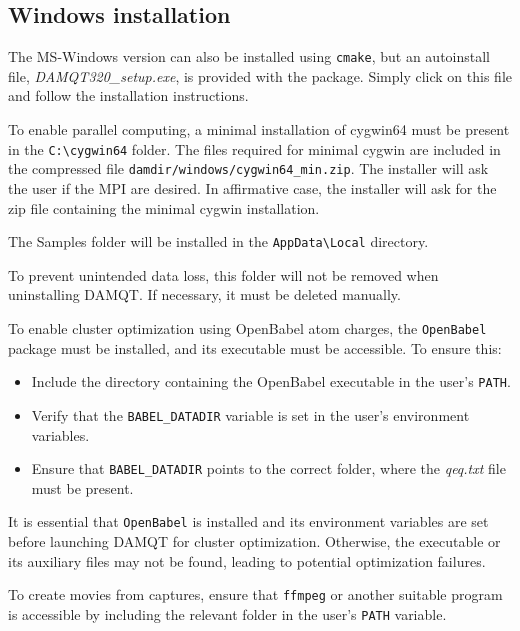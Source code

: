\documentclass[10pt]{article}
\begin{document}
\subsection{Windows installation \label{sec:1.2}}

The MS-Windows version can also be installed using \texttt{cmake}, but an autoinstall file,
{\it DAMQT320\_setup.exe}, is provided with the package. Simply click on this file and follow the installation instructions.

To enable parallel computing, a minimal installation of cygwin64 must be present
in the \texttt{C:\textbackslash{}cygwin64} folder. The files required for minimal cygwin are included
in the compressed file \texttt{damdir/windows/cygwin64\_min.zip}. The installer
will ask the user if the MPI are desired. In affirmative case, the installer will 
ask for the zip file containing the minimal cygwin installation.

The Samples folder will be installed in the \texttt{AppData\textbackslash{}Local} directory.

To prevent unintended data loss, this folder will not be removed when uninstalling DAMQT.
If necessary, it must be deleted manually.

To enable cluster optimization using OpenBabel atom charges, the \texttt{OpenBabel} package must be installed,
and its executable must be accessible. To ensure this:

\begin{itemize}
\item Include the directory containing the OpenBabel executable in the user's \texttt{PATH}.
\item Verify that the \texttt{BABEL\_DATADIR} variable is set in the user's environment variables.
\item Ensure that \texttt{BABEL\_DATADIR} points to the correct folder, where the {\it qeq.txt} file must be present.
\end{itemize}

It is essential that \texttt{OpenBabel} is installed and its environment variables are set
before launching DAMQT for cluster optimization. Otherwise, the executable or its auxiliary files may not be found,
leading to potential optimization failures.

To create movies from captures, ensure that \texttt{ffmpeg} or another suitable program is accessible
by including the relevant folder in the user's \texttt{PATH} variable.
\end{document}
